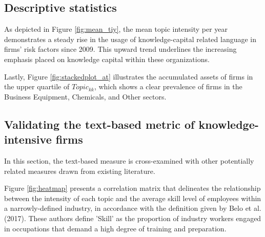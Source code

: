 \documentclass[12pt, letterpaper]{article}
\begin{document}

\subsection{Descriptive statistics}

As depicted in Figure \ref{fig:mean_tiy}, the mean topic intensity per year demonstrates a steady rise in the usage of knowledge-capital related language in firms' risk factors since 2009. This upward trend underlines the increasing emphasis placed on knowledge capital within these organizations.


%

Lastly, Figure \ref{fig:stackedplot_at} illustrates the accumulated assets of firms in the upper quartile of $Topic_{kk}$, which shows a clear prevalence of firms in the Business Equipment, Chemicals, and Other sectors.




\subsection{Validating the text-based metric of knowledge-intensive firms}
  
In this section, the text-based measure \tkk  is cross-examined with other potentially related measures drawn from existing literature.

Figure \ref{fig:heatmap} presents a correlation matrix that delineates the relationship between the intensity of each topic and the average skill level of employees within a narrowly-defined industry, in accordance with the definition given by Belo et al. (2017). These authors define 'Skill' as the proportion of industry workers engaged in occupations that demand a high degree of training and preparation.
\end{document}
